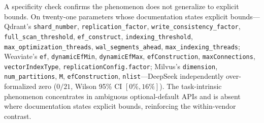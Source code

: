 \documentclass[sigconf]{acmart}
\begin{document}
A specificity check confirms the phenomenon does not generalize to explicit bounds. On twenty-one parameters whose documentation states explicit bounds---Qdrant's \texttt{shard\_number}, \texttt{replication\_factor}, \texttt{write\_consistency\_factor}, \texttt{full\_scan\_threshold}, \texttt{ef\_construct}, \texttt{indexing\_threshold}, \texttt{max\_optimization\_threads}, \texttt{wal\_segments\_ahead}, \texttt{max\_indexing\_threads}; Weaviate's \texttt{ef}, \texttt{dynamicEfMin}, \texttt{dynamicEfMax}, \texttt{efConstruction}, \texttt{maxConnections}, \texttt{vectorIndexType}, \texttt{replicationConfig.factor}; Milvus's \texttt{dimension}, \texttt{num\_partitions}, \texttt{M}, \texttt{efConstruction}, \texttt{nlist}---DeepSeek independently over-formalized zero ($0/21$, Wilson 95\% CI $[0\%, 16\%]$). The task-intrinsic phenomenon concentrates in ambiguous optional-default APIs and is absent where documentation states explicit bounds, reinforcing the within-vendor contrast.
\end{document}

